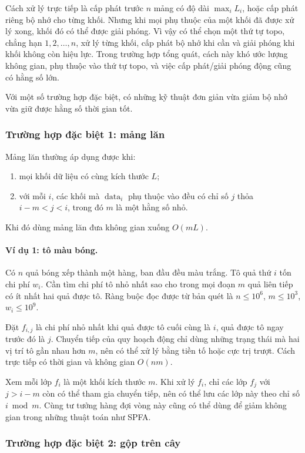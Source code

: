 \documentclass[11pt]{article}
\begin{document}
Cách xử lý trực tiếp là cấp phát trước $n$ mảng có độ dài
$\max_i L_i$, hoặc cấp phát riêng bộ nhớ cho từng khối. Nhưng khi mọi phụ
thuộc của một khối đã được xử lý xong, khối đó có thể được giải phóng. Vì vậy
có thể chọn một thứ tự topo, chẳng hạn $1,2,\ldots,n$, xử lý từng khối, cấp
phát bộ nhớ khi cần và giải phóng khi khối không còn hiệu lực. Trong trường
hợp tổng quát, cách này khó ước lượng không gian, phụ thuộc vào thứ tự topo,
và việc cấp phát/giải phóng động cũng có hằng số lớn.

Với một số trường hợp đặc biệt, có những kỹ thuật đơn giản vừa giảm bộ nhớ vừa
giữ được hằng số thời gian tốt.

\subsubsection{Trường hợp đặc biệt 1: mảng lăn}

Mảng lăn thường áp dụng được khi:
\begin{enumerate}
  \item mọi khối dữ liệu có cùng kích thước $L$;
  \item với mỗi $i$, các khối mà $\operatorname{data}_i$ phụ thuộc vào đều có
  chỉ số $j$ thỏa $i-m<j<i$, trong đó $m$ là một hằng số nhỏ.
\end{enumerate}
Khi đó dùng mảng lăn đưa không gian xuống $O(mL)$.

\paragraph{Ví dụ 1: tô màu bóng.}
Có $n$ quả bóng xếp thành một hàng, ban đầu đều màu trắng. Tô quả thứ $i$ tốn
chi phí $w_i$. Cần tìm chi phí tô nhỏ nhất sao cho trong mọi đoạn $m$ quả liên
tiếp có ít nhất hai quả được tô. Ràng buộc đọc được từ bản quét là
$n\le 10^6$, $m\le 10^3$, $w_i\le 10^9$.

Đặt $f_{i,j}$ là chi phí nhỏ nhất khi quả được tô cuối cùng là $i$, quả được
tô ngay trước đó là $j$. Chuyển tiếp của quy hoạch động chỉ dùng những trạng
thái mà hai vị trí tô gần nhau hơn $m$, nên có thể xử lý bằng tiền tố hoặc cực
trị trượt. Cách trực tiếp có thời gian và không gian $O(nm)$.

Xem mỗi lớp $f_i$ là một khối kích thước $m$. Khi xử lý $f_i$, chỉ các lớp
$f_j$ với $j>i-m$ còn có thể tham gia chuyển tiếp, nên có thể lưu các lớp này
theo chỉ số $i\bmod m$. Cùng tư tưởng hàng đợi vòng này cũng có thể dùng để
giảm không gian trong những thuật toán như SPFA.

\subsubsection{Trường hợp đặc biệt 2: gộp trên cây}
\end{document}
